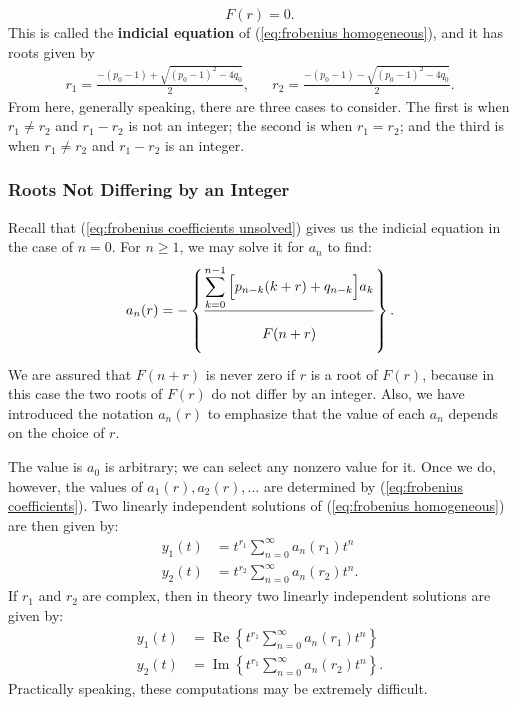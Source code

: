\documentclass{myart}
\newcommand{\term}[1]{\textbf{#1}}
\newcommand{\eq}[1]{(\ref{eq:#1})}
\DeclareMathOperator{\OpRe}{Re}
\DeclareMathOperator{\OpIm}{Im}
\renewcommand{\Re}[1]{\OpRe\left\{#1\right\}}
\renewcommand{\Im}[1]{\OpIm\left\{#1\right\}}
\begin{document}
\begin{equation*}
F(r) = 0.
\end{equation*}
This is called the \term{indicial equation} of \eq{frobenius homogeneous}, and it has roots given by
\begin{align} \label{eq:indicial equation roots}
r_1 = \frac{-(p_0 - 1) + \sqrt{(p_0 - 1)^2 - 4q_0}}{2}, && r_2 = \frac{-(p_0 - 1) - \sqrt{(p_0 - 1)^2 - 4q_0}}{2}.
\end{align}
From here, generally speaking, there are three cases to consider. The first is when $r_1 \neq r_2$ and $r_1 - r_2$ is not an integer; the second is when $r_1 = r_2$; and the third is when $r_1 \neq r_2$ and $r_1 - r_2$ is an integer.

\subsubsection{Roots Not Differing by an Integer} \label{subsubsec:frobenius roots not differing by an integer}

Recall that \eq{frobenius coefficients unsolved} gives us the indicial equation in the case of $n = 0$. For $n \geq 1$, we may solve it for $a_n$ to find:
\begin{equation} \label{eq:frobenius coefficients}
a_n(r) = -\left\{\frac{\displaystyle \sum_{k=0}^{n-1} \Big[p_{n-k} (k+r) + q_{n-k}\Big] a_k}{\displaystyle \vphantom{\sum_0^0} F(n + r)}\right\}.
\end{equation}
We are assured that $F(n + r)$ is never zero if $r$ is a root of $F(r)$, because in this case the two roots of $F(r)$ do not differ by an integer. Also, we have introduced the notation $a_n(r)$ to emphasize that the value of each $a_n$ depends on the choice of $r$.

The value is $a_0$ is arbitrary; we can select any nonzero value for it. Once we do, however, the values of $a_1(r), a_2(r), \ldots$ are determined by \eq{frobenius coefficients}. Two linearly independent solutions of \eq{frobenius homogeneous} are then given by:
\begin{align*}
y_1(t) &= t^{r_1} \sum_{n=0}^\infty a_n(r_1) t^n \\
y_2(t) &= t^{r_2} \sum_{n=0}^\infty a_n(r_2) t^n.
\end{align*}
If $r_1$ and $r_2$ are complex, then in theory two linearly independent solutions are given by:
\begin{align*}
y_1(t) &= \Re{t^{r_1} \sum_{n=0}^\infty a_n(r_1) t^n} \\
y_2(t) &= \Im{t^{r_1} \sum_{n=0}^\infty a_n(r_2) t^n}.
\end{align*}
Practically speaking, these computations may be extremely difficult.
\end{document}
